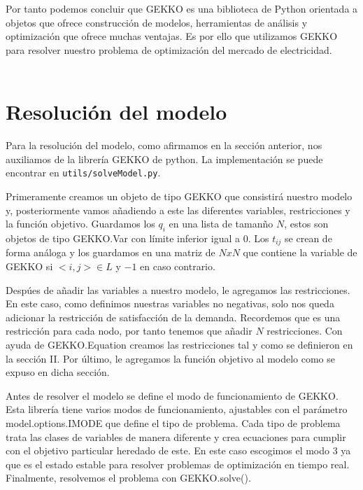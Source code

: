 \documentclass[twoside]{article}
\begin{document}
\begin{multicols}{2}
Por tanto podemos concluir que GEKKO es una biblioteca de Python orientada a objetos que ofrece construcci\'on de modelos, herramientas de an\'alisis y optimizaci\'on que ofrece muchas ventajas. Es por ello que utilizamos GEKKO para resolver nuestro problema de optimizaci\'on del mercado de electricidad.\\\\



\section{Resoluci\'on del modelo}

Para la resoluci\'on del modelo, como afirmamos en la secci\'on anterior, nos auxiliamos de la librer\'ia GEKKO de python. La implementaci\'on se puede encontrar en \texttt{utils/solveModel.py}.

Primeramente creamos un objeto de tipo GEKKO que consistir\'a nuestro modelo y, posteriormente vamos a\~nadiendo a este las diferentes variables, restricciones y la funci\'on objetivo. Guardamos los $q_i$ en una lista de taman\~no $N$, estos son objetos de tipo \textsf{GEKKO.Var} con l\'imite inferior igual a $0$. Los $t_{ij}$ se crean de forma an\'aloga y los guardamos en una matriz de $NxN$ que contiene la variable de GEKKO si $<i,j> \in L$ y $-1$ en caso contrario. 

Desp\'ues de a\~nadir las variables a nuestro modelo, le agregamos las restricciones. En este caso, como definimos nuestras variables no negativas, solo nos queda adicionar la restricci\'on de satisfacci\'on de la demanda. Recordemos que es una restricci\'on para cada nodo, por tanto tenemos que a\~nadir $N$ restricciones. Con ayuda de \textsf{GEKKO.Equation} creamos las restricciones tal y como se definieron en la secci\'on II. Por \'ultimo, le agregamos la funci\'on objetivo al modelo como se expuso en dicha secci\'on.

Antes de resolver el modelo se define el modo de funcionamiento de GEKKO. Esta librer\'ia tiene varios modos de funcionamiento, ajustables con el par\'ametro \textsf{model.options.IMODE} que define el tipo de problema. Cada tipo de problema trata las clases de variables de manera diferente y crea ecuaciones para cumplir con el objetivo particular heredado de este. En este caso escogimos el modo 3 ya que es el estado estable para resolver problemas de optimizaci\'on en tiempo real. Finalmente, resolvemos el problema con \textsf{GEKKO.solve()}. 


\end{multicols}
\end{document}

